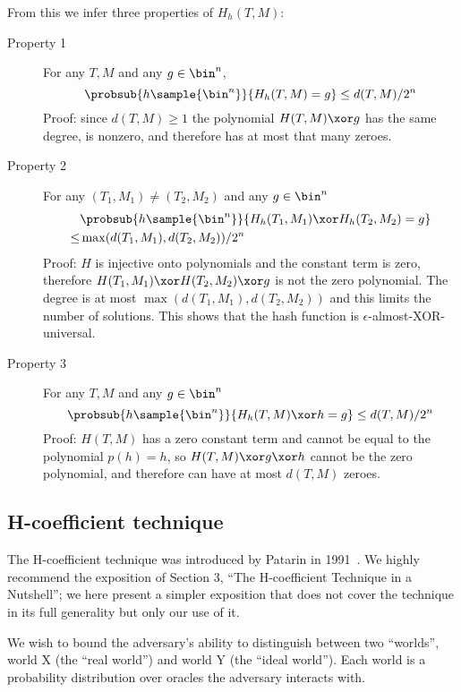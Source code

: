 \documentclass[letterpaper,11pt]{article}
\begin{document}
From this we infer three properties of \(H_h(T, M)\):
\begin{description}
    \item[Property 1]
    For any \(T, M\) and any \(g \in \bin^n\),
    \begin{displaymath}
        \probsub{h\sample{\bin^n}}{H_h(T, M) = g} \leq d(T, M)/2^n
    \end{displaymath}
    Proof: since \(d(T, M) \geq 1\)
    the polynomial \(H(T, M) \xor g\) has the same degree,
    is nonzero,
    and therefore has at most that many zeroes.
    \item[Property 2] 
    For any \((T_1, M_1) \neq (T_2, M_2)\) and any \(g \in \bin^n\)
    \begin{align*}
        & \probsub{h\sample{\bin^n}}{H_h(T_1, M_1) \xor H_h(T_2, M_2) = g} \\
        \leq  & \max(d(T_1, M_1), d(T_2, M_2))/2^n
    \end{align*}
    Proof: \(H\) is injective onto polynomials
    and the constant term is zero, therefore
    \(H(T_1, M_1) \xor H(T_2, M_2) \xor g\)
    is not the zero polynomial.
    The degree is at most \(\max(d(T_1, M_1), d(T_2, M_2))\)
    and this limits the number of solutions.
    This shows that the hash function is
    \(\epsilon\)-almost-XOR-universal.
    \item[Property 3]
    For any \(T, M\) and any \(g \in \bin^n\)
    \begin{displaymath}
        \probsub{h\sample{\bin^n}}{H_h(T, M) \xor h = g} \leq d(T, M)/2^n
    \end{displaymath}
    Proof: \(H(T, M)\) has a zero constant term and
    cannot be equal to the polynomial \(p(h) = h\),
    so \(H(T, M) \xor g \xor h\) cannot be the zero polynomial, and
    therefore can have at most \(d(T, M)\) zeroes.
\end{description}

\subsection{H-coefficient technique}
The H-coefficient technique was introduced by Patarin in 1991~\cite{ppdes,hco}.
We highly recommend the exposition of
\cite{hco2} Section 3,
``The H-coefficient Technique in a Nutshell'';
we here present a simpler exposition that
does not cover the technique in its full
generality but only our use of it.

We wish to bound the adversary's ability to distinguish between
two ``worlds'', world X (the ``real world'') and world Y (the ``ideal world'').
Each world is a probability distribution over oracles the adversary
interacts with.
\end{document}
